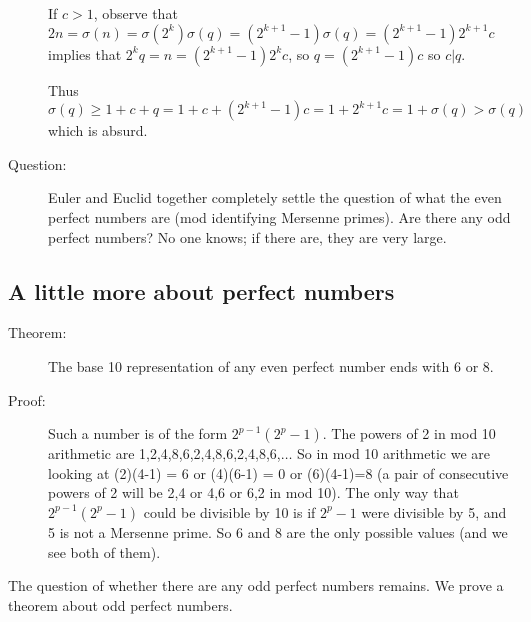 \documentclass[12pt]{article}
\begin{document}
\begin{description}
If $c>1$, observe that $2n = \sigma(n)= \sigma(2^k)\sigma(q)= (2^{k+1}-1)\sigma(q) =  (2^{k+1}-1)2^{k+1}c$ implies that $2^kq=n=(2^{k+1}-1)2^{k}c$, so $q=(2^{k+1}-1)c$  so $c | q$.

Thus $\sigma(q) \geq 1+c+q = 1+c+(2^{k+1}-1)c = 1+2^{k+1}c =  1+\sigma(q) >\sigma(q)$ which is absurd.

\item[Question:]   Euler and Euclid together completely settle the question of what the even perfect numbers are (mod identifying Mersenne primes).  Are there any odd perfect numbers?  No one knows; if there are, they are very large.

\end{description}

\subsection{A little more about perfect numbers}

\begin{description}

\item[Theorem:]  The base 10 representation of any even perfect number ends with 6 or 8.

\item[Proof:]  Such a number is of the form $2^{p-1}(2^p-1)$.  The powers of 2 in mod 10 arithmetic are 1,2,4,8,6,2,4,8,6,2,4,8,6,$\ldots$  So in mod 10 arithmetic we are looking
at (2)(4-1) = 6 or (4)(6-1) = 0 or (6)(4-1)=8 (a pair of consecutive powers of 2 will be  2,4 or 4,6 or 6,2 in mod 10).   The only way that $2^{p-1}(2^p-1)$ could be divisible by 10
is if $2^p-1$ were divisible by 5, and 5 is not a Mersenne prime.  So 6 and 8 are the only possible values (and we see both of them).

\end{description}

The question of whether there are any odd perfect numbers remains.  We prove a theorem about odd perfect numbers.
\end{document}
